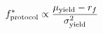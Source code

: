 \documentclass[preview]{standalone}
\begin{document}
\begin{align*}
\special{dvisvgm:raw <g id='unique000'>}f^*_{\text{protocol}} \propto \frac{\mu_{\text{yield}} - r_f}{\sigma^2_{\text{yield}}}\special{dvisvgm:raw </g>}
\end{align*}
\end{document}
